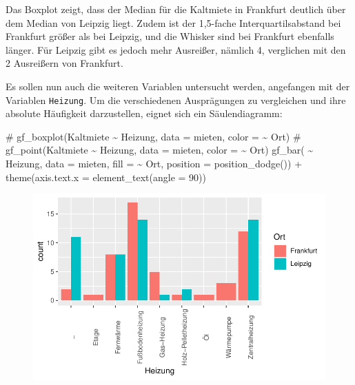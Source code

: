 \documentclass[
  a4paper,
  DIV=11]{scrartcl}
\newenvironment{Shaded}{\begin{snugshade}}{\end{snugshade}}
\newcommand{\AttributeTok}[1]{\textcolor[rgb]{0.40,0.45,0.13}{#1}}
\newcommand{\CommentTok}[1]{\textcolor[rgb]{0.37,0.37,0.37}{#1}}
\newcommand{\DecValTok}[1]{\textcolor[rgb]{0.68,0.00,0.00}{#1}}
\newcommand{\FunctionTok}[1]{\textcolor[rgb]{0.28,0.35,0.67}{#1}}
\newcommand{\NormalTok}[1]{\textcolor[rgb]{0.00,0.23,0.31}{#1}}
\newcommand{\SpecialCharTok}[1]{\textcolor[rgb]{0.37,0.37,0.37}{#1}}
\begin{document}
Das Boxplot zeigt, dass der Median für die Kaltmiete in Frankfurt
deutlich über dem Median von Leipzig liegt. Zudem ist der 1,5-fache
Interquartilsabstand bei Frankfurt größer als bei Leipzig, und die
Whisker sind bei Frankfurt ebenfalls länger. Für Leipzig gibt es jedoch
mehr Ausreißer, nämlich 4, verglichen mit den 2 Ausreißern von
Frankfurt.

Es sollen nun auch die weiteren Variablen untersucht werden, angefangen
mit der Variablen \texttt{Heizung}. Um die verschiedenen Ausprägungen zu
vergleichen und ihre absolute Häufigkeit darzustellen, eignet sich ein
Säulendiagramm:

\begin{Shaded}
\begin{Highlighting}[]
\CommentTok{\# gf\_boxplot(Kaltmiete \textasciitilde{} Heizung, data = mieten, color = \textasciitilde{} Ort)}
\CommentTok{\# gf\_point(Kaltmiete \textasciitilde{} Heizung, data = mieten, color = \textasciitilde{} Ort)}
\FunctionTok{gf\_bar}\NormalTok{( }\SpecialCharTok{\textasciitilde{}}\NormalTok{ Heizung, }\AttributeTok{data =}\NormalTok{ mieten, }\AttributeTok{fill =} \SpecialCharTok{\textasciitilde{}}\NormalTok{ Ort, }\AttributeTok{position =} \FunctionTok{position\_dodge}\NormalTok{()) }\SpecialCharTok{+} \FunctionTok{theme}\NormalTok{(}\AttributeTok{axis.text.x =} \FunctionTok{element\_text}\NormalTok{(}\AttributeTok{angle =} \DecValTok{90}\NormalTok{))}
\end{Highlighting}
\end{Shaded}

\begin{figure}[H]

{\centering \includegraphics{Mietmodellierung_files/figure-pdf/unnamed-chunk-9-1.pdf}

}

\end{figure}
\end{document}
